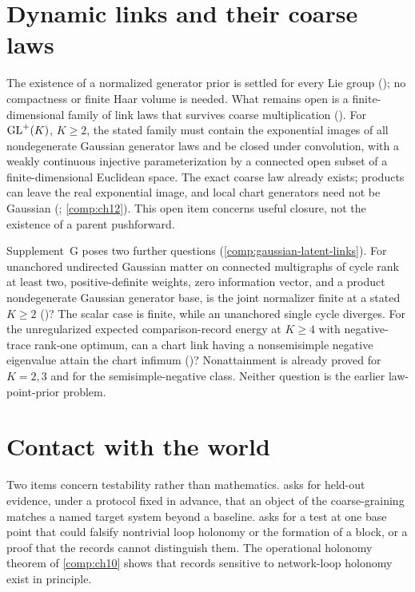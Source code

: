 \section*{Dynamic links and their coarse laws}

The existence of a normalized generator prior is settled for every Lie group
(); no compactness or finite Haar volume is needed. What remains
open is a finite-dimensional family of link laws that survives coarse multiplication
(). For $\mathrm{GL}^+(K)$, $K\geq2$, the stated family must contain
the exponential images of all nondegenerate Gaussian generator laws and be closed under
convolution, with a weakly continuous injective parameterization by a connected open subset of a
finite-dimensional Euclidean space. The exact coarse law already exists; products can leave the
real exponential image, and local chart generators need not be Gaussian
(; \cref{comp:ch12}). This open item concerns useful
closure, not the existence of a parent pushforward.

Supplement~G poses two further questions (\cref{comp:gaussian-latent-links}). For unanchored
undirected Gaussian matter on connected multigraphs of cycle rank at least two, positive-definite
weights, zero information vector, and a product nondegenerate Gaussian generator base, is the
joint normalizer finite at a stated $K\geq2$ ()?
The scalar case is finite, while an unanchored single cycle diverges. For the unregularized
expected comparison-record energy at $K\geq4$ with negative-trace rank-one optimum, can a chart
link having a nonsemisimple negative eigenvalue attain the chart infimum
()? Nonattainment is already proved for $K=2,3$ and for the
semisimple-negative class. Neither question is the earlier law-point-prior problem.

\section*{Contact with the world}

Two items concern testability rather than mathematics.  asks
for held-out evidence, under a protocol fixed in advance, that an object of the coarse-graining
matches a named target system beyond a baseline.  asks for a test at one
base point that could falsify nontrivial loop holonomy or the formation of a block, or a proof that
the records cannot distinguish them. The operational holonomy theorem of \cref{comp:ch10} shows that
records sensitive to network-loop holonomy exist in principle.

